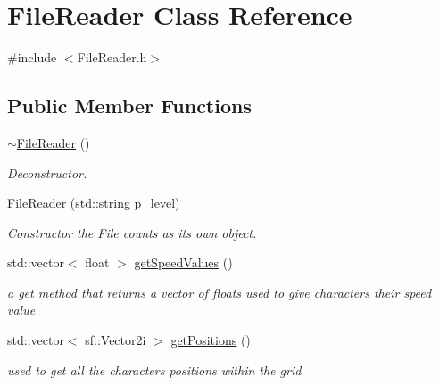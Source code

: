 \hypertarget{class_file_reader}{}\section{File\+Reader Class Reference}
\label{class_file_reader}


{\ttfamily \#include $<$File\+Reader.\+h$>$}

\subsection*{Public Member Functions}
\begin{DoxyCompactItemize}
\item 
\mbox{\label{class_file_reader_a1382969e8f1468f3b04ad4b44ab39dee}} 
\mbox{\hyperlink{class_file_reader_a1382969e8f1468f3b04ad4b44ab39dee}{$\sim$\+File\+Reader}} ()
\begin{DoxyCompactList}\small\item\em Deconstructor. \end{DoxyCompactList}\item 
\mbox{\label{class_file_reader_a746a2d82fb15782f219cb38fa5bd643a}} 
\mbox{\hyperlink{class_file_reader_a746a2d82fb15782f219cb38fa5bd643a}{File\+Reader}} (std\+::string p\+\_\+level)
\begin{DoxyCompactList}\small\item\em Constructor the File counts as its own object. \end{DoxyCompactList}\item 
std\+::vector$<$ float $>$ \mbox{\hyperlink{class_file_reader_ae3af120919f987fec28d577d9e67a7d6}{get\+Speed\+Values}} ()
\begin{DoxyCompactList}\small\item\em a get method that returns a vector of floats used to give characters their speed value \end{DoxyCompactList}\item 
\mbox{\label{class_file_reader_aed6a77a700fd3e5201dc13535833e50f}} 
std\+::vector$<$ sf\+::\+Vector2i $>$ \mbox{\hyperlink{class_file_reader_aed6a77a700fd3e5201dc13535833e50f}{get\+Positions}} ()
\begin{DoxyCompactList}\small\item\em used to get all the characters positions within the grid \end{DoxyCompactList}\item 

\end{DoxyCompactItemize}
